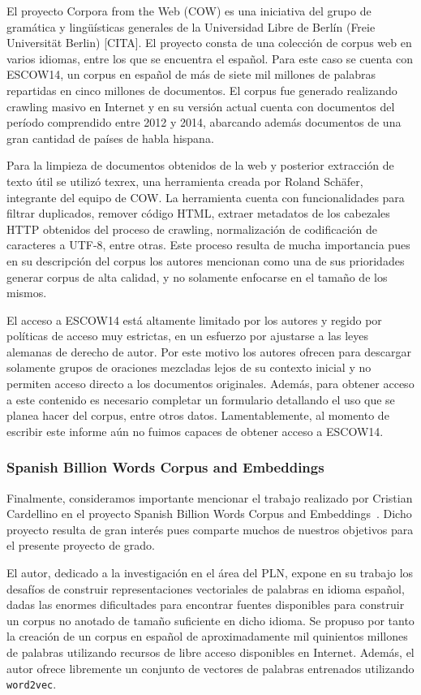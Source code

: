 El proyecto Corpora from the Web (COW) es una iniciativa del grupo de gramática y lingüísticas
generales de la Universidad Libre de Berlín (Freie Universität Berlin) [CITA]. El proyecto consta
de una colección de corpus web en varios idiomas, entre los que se encuentra el español. Para este
caso se cuenta con ESCOW14, un corpus en español de más de siete mil millones de palabras repartidas
en cinco millones de documentos. El corpus fue generado realizando crawling masivo en Internet y en
su versión actual cuenta con documentos del período comprendido entre 2012 y 2014, abarcando además
documentos de una gran cantidad de países de habla hispana.

Para la limpieza de documentos obtenidos de la web y posterior extracción de texto útil se utilizó
texrex, una herramienta creada por Roland Schäfer, integrante del equipo de COW. La herramienta cuenta
con funcionalidades para filtrar duplicados, remover código HTML, extraer metadatos de los cabezales
HTTP obtenidos del proceso de crawling, normalización de codificación de caracteres a UTF-8, entre
otras. Este proceso resulta de mucha importancia pues en su descripción del corpus los autores
mencionan como una de sus prioridades generar corpus de alta calidad, y no solamente enfocarse en el
tamaño de los mismos.

El acceso a ESCOW14 está altamente limitado por los autores y regido por políticas de acceso muy
estrictas, en un esfuerzo por ajustarse a las leyes alemanas de derecho de autor. Por este motivo
los autores ofrecen para descargar solamente grupos de oraciones mezcladas lejos de su contexto inicial
y no permiten acceso directo a los documentos originales. Además, para obtener acceso a este contenido
es necesario completar un formulario detallando el uso que se planea hacer del corpus, entre otros
datos. Lamentablemente, al momento de escribir este informe aún no fuimos capaces de obtener acceso
a ESCOW14.

\subsubsection{Spanish Billion Words Corpus and Embeddings}

Finalmente, consideramos importante mencionar el trabajo realizado por Cristian Cardellino en el proyecto
Spanish Billion Words Corpus and Embeddings~\cite{SBWCE}. Dicho proyecto resulta de gran interés pues
comparte muchos de nuestros objetivos para el presente proyecto de grado.

El autor, dedicado a la investigación en el área del PLN, expone en su trabajo los desafíos de construir
representaciones vectoriales de palabras en idioma español, dadas las enormes dificultades para encontrar
fuentes disponibles para construir un corpus no anotado de tamaño suficiente en dicho idioma. Se propuso
por tanto la creación de un corpus en español de aproximadamente mil quinientos millones de palabras
utilizando recursos de libre acceso disponibles en Internet. Además, el autor ofrece libremente un
conjunto de vectores de palabras entrenados utilizando \texttt{word2vec}.

